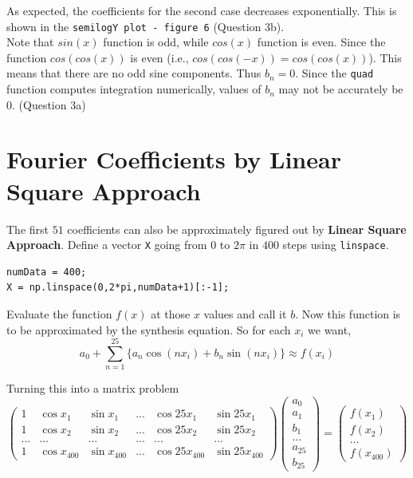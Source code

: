 \documentclass[12pt, a4paper]{report}
\begin{document}
As expected, the coefficients for the second case decreases exponentially. This is shown in the \texttt{semilogY plot - figure 6} (Question 3b). 
\\

Note that $sin(x)$ function is odd, while $cos(x)$ function is even. Since the function $cos(cos(x))$ is even (i.e., $cos(cos(-x)) = cos(cos(x))$). This means that there are no odd sine components. Thus $b_n = 0$. Since the \texttt{quad} function computes integration numerically, values of $b_n$ may not be accurately be $0$. (Question 3a)

\section*{Fourier Coefficients by Linear Square Approach}

The first $51$ coefficients can also be approximately figured out by \textbf{Linear Square Approach}. Define a vector \texttt{X} going from $0$ to $2\pi$ in $400$ steps using \texttt{linspace}.
\begin{verbatim}
numData = 400;
X = np.linspace(0,2*pi,numData+1)[:-1];
\end{verbatim}

Evaluate the function $f(x)$ at those $x$ values and call it $b$. Now this function is to be approximated by the synthesis equation. So for each $x_i$ we want,
\begin{equation*}
a_{0} + \sum_{n=1}^{25} \{a_{n}\cos(nx_i)+b_{n}\sin(nx_i)\} \approx f(x_i)
\end{equation*}

Turning this into a matrix problem
\begin{equation*}
\begin{pmatrix}
1 & \cos x_1 & \sin x_1 & ... & \cos 25x_1 & \sin 25x_1 \\
1 & \cos x_2 & \sin x_2 & ... & \cos 25x_2 & \sin 25x_2 \\
... & ... & ... & ... & ... & ... \\
1 & \cos x_{400} & \sin x_{400} & ... & \cos 25x_{400} & \sin 25x_{400}
\end{pmatrix}
\begin{pmatrix}
a_0\\a_1\\b_1\\...\\a_{25}\\b_{25}
\end{pmatrix}
=
\begin{pmatrix}
f(x_1) \\ f(x_2) \\ ... \\ f(x_{400})
\end{pmatrix}
\end{equation*}
\end{document}
